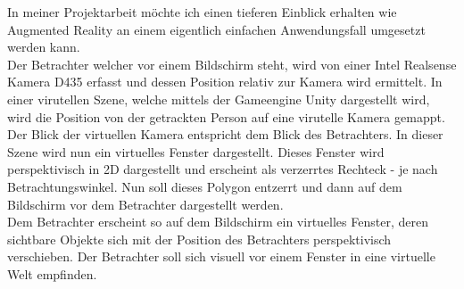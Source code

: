 
In meiner Projektarbeit m\"ochte ich einen tieferen Einblick erhalten wie Augmented Reality an einem eigentlich einfachen Anwendungsfall umgesetzt werden kann.\\ Der Betrachter welcher vor einem Bildschirm steht, wird von einer Intel Realsense Kamera D435 erfasst und dessen Position relativ zur Kamera wird ermittelt. In einer virutellen Szene, welche mittels der Gameengine Unity dargestellt wird, wird die Position von der getrackten Person auf eine virutelle Kamera gemappt. Der Blick der virtuellen Kamera entspricht dem Blick des Betrachters. In dieser Szene wird nun ein virtuelles Fenster dargestellt. Dieses Fenster wird perspektivisch in 2D dargestellt und erscheint als verzerrtes Rechteck - je nach Betrachtungswinkel. Nun soll dieses Polygon entzerrt und dann auf dem Bildschirm vor dem Betrachter dargestellt werden. \\ Dem Betrachter erscheint so auf dem Bildschirm ein virtuelles Fenster, deren sichtbare Objekte sich mit der Position des Betrachters perspektivisch verschieben. Der Betrachter soll sich visuell vor einem Fenster in eine virtuelle Welt empfinden.

